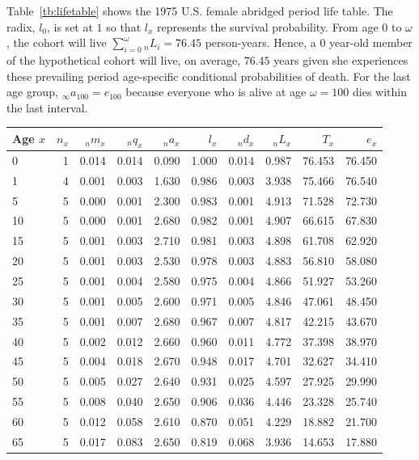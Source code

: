 \documentclass[11pt,letterpaper]{article}
\theoremstyle{plain}
\begin{document}
Table~\ref{tb:lifetable} shows the 1975 U.S. female abridged period
life table.  The radix, $l_0$, is set at $1$ so that $l_x$ represents
the survival probability.  From age $0$ to $\omega$,
the cohort will live
$\sum_{i=0}^{\omega}{_n}L_i=76.45$ person-years.  Hence, a $0$ year-old
member of the hypothetical cohort will live, on average, $76.45$ years
given she experiences these prevailing period age-specific
conditional probabilities of death.  For the last age group,
$_\infty a_{100}=e_{100}$ because everyone who is alive at age
$\omega=100$ dies within the last interval.

\begin{table}[htbp]
\centering
\begin{tabular}{lrrrrrrrrr}
  \toprule
Age $x$ & $n_x$ & $_nm_x$ & $_nq_x$& $_na_x$ & $l_x$ & $_nd_x$ & $_nL_x$ & $T_x$ & $e_x$ \\ 
  \midrule
0 & 1 & 0.014 & 0.014 & 0.090 & 1.000 & 0.014 & 0.987 & 76.453 & 76.450 \\ 
  1 & 4 & 0.001 & 0.003 & 1.630 & 0.986 & 0.003 & 3.938 & 75.466 & 76.540 \\ 
  5 & 5 & 0.000 & 0.001 & 2.300 & 0.983 & 0.001 & 4.913 & 71.528 & 72.730 \\ 
  10 & 5 & 0.000 & 0.001 & 2.680 & 0.982 & 0.001 & 4.907 & 66.615 & 67.830 \\ 
  15 & 5 & 0.001 & 0.003 & 2.710 & 0.981 & 0.003 & 4.898 & 61.708 & 62.920 \\ 
  20 & 5 & 0.001 & 0.003 & 2.530 & 0.978 & 0.003 & 4.883 & 56.810 & 58.080 \\ 
  25 & 5 & 0.001 & 0.004 & 2.580 & 0.975 & 0.004 & 4.866 & 51.927 & 53.260 \\ 
  30 & 5 & 0.001 & 0.005 & 2.600 & 0.971 & 0.005 & 4.846 & 47.061 & 48.450 \\ 
  35 & 5 & 0.001 & 0.007 & 2.680 & 0.967 & 0.007 & 4.817 & 42.215 & 43.670 \\ 
  40 & 5 & 0.002 & 0.012 & 2.660 & 0.960 & 0.011 & 4.772 & 37.398 & 38.970 \\ 
  45 & 5 & 0.004 & 0.018 & 2.670 & 0.948 & 0.017 & 4.701 & 32.627 & 34.410 \\ 
  50 & 5 & 0.005 & 0.027 & 2.640 & 0.931 & 0.025 & 4.597 & 27.925 & 29.990 \\ 
  55 & 5 & 0.008 & 0.040 & 2.650 & 0.906 & 0.036 & 4.446 & 23.328 & 25.740 \\ 
  60 & 5 & 0.012 & 0.058 & 2.610 & 0.870 & 0.051 & 4.229 & 18.882 & 21.700 \\ 
  65 & 5 & 0.017 & 0.083 & 2.650 & 0.819 & 0.068 & 3.936 & 14.653 & 17.880 \\ 

\end{tabular}
\end{table}
\end{document}
